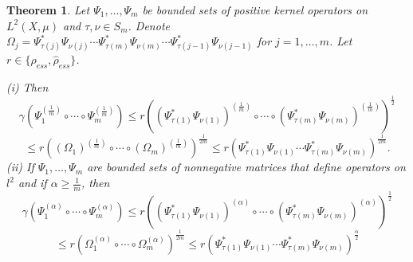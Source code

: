 \documentclass[12pt, reqno]{amsart}
\newtheorem{theorem}{Theorem}[section]
\theoremstyle{definition}
\theoremstyle{remark}
\numberwithin{equation}{section}
\newcommand{\be}{\begin{equation}}
\newcommand{\ee}{\end{equation}}
\begin{document}
\medskip

\begin{theorem}
\label{zivalska_ess3}
	Let $\Psi_1, \ldots , \Psi_m$ be bounded sets of positive kernel operators on $L^2(X, \mu)$ and $\tau, \nu\in S_m$. Denote  $\Omega_j=\Psi_{\tau(j)}^*\Psi_{\nu(j)}\cdots\Psi_{\tau(m)}^*\Psi_{\nu(m)}
	\cdots\Psi_{\tau(j-1)}^*\Psi_{\nu(j-1)}$ for $j=1, \ldots , m$. Let $r\in\{\rho_{ess}, \hat{\rho}_{ess}\}$.

\noindent  (i) Then
$$\gamma(\Psi_1^{(\frac{1}{m})}\circ\cdots\circ\Psi_m^{(\frac{1}{m})})\le r((\Psi_{\tau(1)}^*\Psi_{\nu(1)})^{(\frac{1}{m})}\circ\cdots\circ(\Psi_{\tau(m)}^*\Psi_{\nu(m)})^{(\frac{1}{m})})^{\frac{1}{2}}$$
\be
\le r((\Omega_1)^{(\frac{1}{m})}\circ\cdots\circ(\Omega_m)^{(\frac{1}{m})})^{\frac{1}{2m}}\le r(\Psi_{\tau(1)}^*\Psi_{\nu(1)}\cdots\Psi_{\tau(m)}^*\Psi_{\nu(m)})^{\frac{1}{2m}}.
\label{ziv3}
\ee
\noindent (ii) If $\Psi_1, \ldots , \Psi_m$ are bounded sets of nonnegative matrices that define operators on $l^2$ and if $\alpha\ge\frac{1}{m}$, then
$$\gamma(\Psi_1^{(\alpha)}\circ\cdots\circ\Psi_m^{(\alpha)})\le r((\Psi_{\tau(1)}^*\Psi_{\nu(1)})^{(\alpha)}\circ\cdots\circ(\Psi_{\tau(m)}^*\Psi_{\nu(m)})^{(\alpha)})^{\frac{1}{2}}$$
\be
\le r(\Omega_1^{(\alpha)}\circ\cdots\circ\Omega_m^{(\alpha)})^{\frac{1}{2m}}\le r(\Psi_{\tau(1)}^*\Psi_{\nu(1)}\cdots\Psi_{\tau(m)}^*\Psi_{\nu(m)})^{\frac{\alpha}{2}}
\label{ziv4}
\ee 
\end{theorem}
\end{document}
